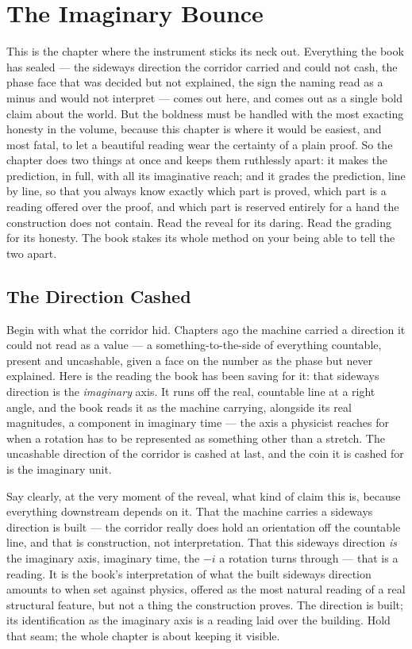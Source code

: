 \chapter{The Imaginary Bounce}

This is the chapter where the instrument sticks its neck out. Everything the book has sealed --- the sideways
direction the corridor carried and could not cash, the phase face that was decided but not explained, the sign the
naming read as a minus and would not interpret --- comes out here, and comes out as a single bold claim about the
world. But the boldness must be handled with the most exacting honesty in the volume, because this chapter is
where it would be easiest, and most fatal, to let a beautiful reading wear the certainty of a plain proof. So the
chapter does two things at once and keeps them ruthlessly apart: it makes the prediction, in full, with all its
imaginative reach; and it grades the prediction, line by line, so that you always know exactly which part is
proved, which part is a reading offered over the proof, and which part is reserved entirely for a hand the
construction does not contain. Read the reveal for its daring. Read the grading for its honesty. The book stakes
its whole method on your being able to tell the two apart.

\section{The Direction Cashed}

Begin with what the corridor hid. Chapters ago the machine carried a direction it could not read as a value --- a
something-to-the-side of everything countable, present and uncashable, given a face on the number as the phase but
never explained. Here is the reading the book has been saving for it: that sideways direction is the
\emph{imaginary} axis. It runs off the real, countable line at a right angle, and the book reads it as the machine
carrying, alongside its real magnitudes, a component in imaginary time --- the axis a physicist reaches for when a
rotation has to be represented as something other than a stretch. The uncashable direction of the corridor is
cashed at last, and the coin it is cashed for is the imaginary unit.

Say clearly, at the very moment of the reveal, what kind of claim this is, because everything downstream depends
on it. That the machine carries a sideways direction is built --- the corridor really does hold an orientation off
the countable line, and that is construction, not interpretation. That this sideways direction \emph{is} the
imaginary axis, imaginary time, the $-i$ a rotation turns through --- that is a reading. It is the book's
interpretation of what the built sideways direction amounts to when set against physics, offered as the most
natural reading of a real structural feature, but not a thing the construction proves. The direction is built; its
identification as the imaginary axis is a reading laid over the building. Hold that seam; the whole chapter is
about keeping it visible.

